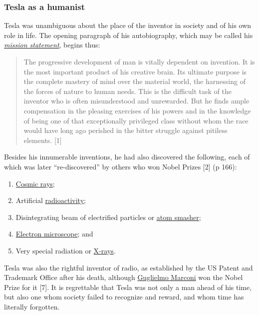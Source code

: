 \documentclass[
  11pt,
  a4paper,
]{article}
\providecommand{\tightlist}{%
  \setlength{\itemsep}{0pt}\setlength{\parskip}{0pt}}
\begin{document}
\hypertarget{tesla-as-a-humanist}{%
\subsubsection{Tesla as a humanist}\label{tesla-as-a-humanist}}

Tesla was unambiguous about the place of the inventor in society and of
his own role in life. The opening paragraph of his autobiography, which
may be called his
\href{https://en.wikipedia.org/wiki/Mission_statement}{\emph{mission
statement}}, begins thus:

\begin{quote}
The progressive development of man is vitally dependent on invention. It
is the most important product of his creative brain. Its ultimate
purpose is the complete mastery of mind over the material world, the
harnessing of the forces of nature to human needs. This is the difficult
task of the inventor who is often misunderstood and unrewarded. But he
finds ample compensation in the pleasing exercises of his powers and in
the knowledge of being one of that exceptionally privileged class
without whom the race would have long ago perished in the bitter
struggle against pitiless elements. {[}1{]}
\end{quote}

Besides his innumerable inventions, he had also discovered the
following, each of which was later ``re-discovered'' by others who won
Nobel Prizes {[}2{]} (p 166):

\begin{enumerate}
\tightlist
\item
  \href{https://en.wikipedia.org/wiki/Cosmic_ray}{Cosmic rays};
\item
  Artificial
  \href{https://www.britannica.com/science/radioactivity}{radioactivity};
\item
  Disintegrating beam of electrified particles or
  \href{https://en.wikipedia.org/wiki/Particle_accelerator}{atom
  smasher};
\item
  \href{https://en.wikipedia.org/wiki/Electron_microscope}{Electron
  microscope}; and
\item
  Very special radiation or
  \href{https://en.wikipedia.org/wiki/X-ray}{X-rays}.
\end{enumerate}

Tesla was also the rightful inventor of radio, as established by the US
Patent and Trademark Office after his death, although
\href{https://en.wikipedia.org/wiki/Guglielmo_Marconi}{Guglielmo
Marconi} won the Nobel Prize for it {[}7{]}. It is regrettable that
Tesla was not only a man ahead of his time, but also one whom society
failed to recognize and reward, and whom time has literally forgotten.
\end{document}
